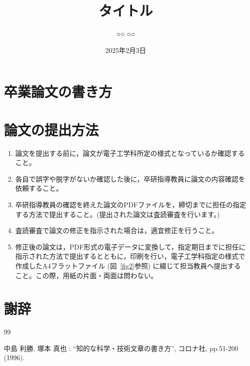 \documentclass{ujreport}%
\title{タイトル}%
\author{○○ ○○}%
\date{2025年2月3日}
\begin{document}
%
\maketitle%
\setcounter{page}{1}%

\tableofcontents %

\chapter{卒業論文の書き方}%


\chapter{論文の提出方法}

\begin{enumerate}%
\item 論文を提出する前に，論文が電子工学科所定の様式となっているか確認すること。
\item 各自で誤字や脱字がないか確認した後に，卒研指導教員に論文の内容確認を依頼すること。
\item 卒研指導教員の確認を終えた論文のPDFファイルを，締切までに担任の指定する方法で提出すること。(提出された論文は査読審査を行います。)
\item 査読審査で論文の修正を指示された場合は，適宜修正を行うこと。
\item 修正後の論文は，PDF形式の電子データに変換して，指定期日までに担任に指示された方法で提出するとともに，印刷を行い，電子工学科指定の様式で作成したA4フラットファイル (図~\ref{fig2}参照) に綴じて担当教員へ提出すること。この際，用紙の片面・両面は問わない。
\end{enumerate}



\chapter*{謝辞}


\begin{thebibliography}{99}
中島 利勝, 塚本 真也 : ``知的な科学・技術文章の書き方'', コロナ社, pp.51-200 (1996). 
\end{thebibliography}


\end{document}

